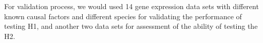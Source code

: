 For validation process, we would used 14 gene expression data sets with different known causal factors and different species for validating the performance of testing H1, and another two data sets for assessment of the ability of testing the H2. %





